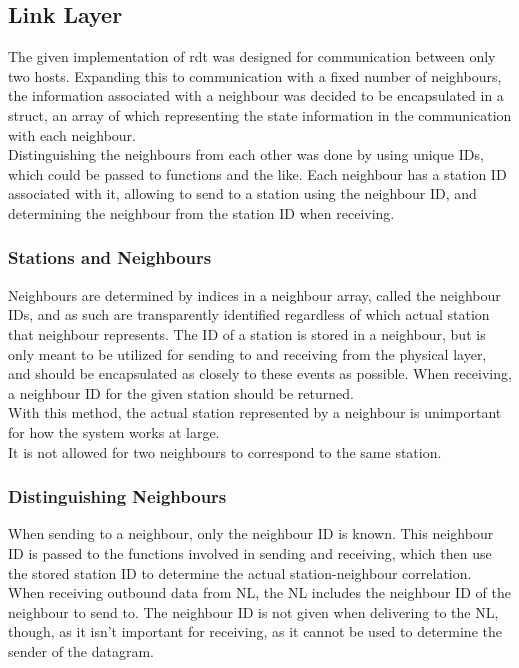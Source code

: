 \subsection{Link Layer}
The given implementation of rdt was designed for communication between only two hosts. Expanding this to communication with a fixed number of neighbours, the information associated with a neighbour was decided to be encapsulated in a struct, an array of which representing the state information in the communication with each neighbour.\\
Distinguishing the neighbours from each other was done by using unique IDs, which could be passed to functions and the like. Each neighbour has a station ID associated with it, allowing to send to a station using the neighbour ID, and determining the neighbour from the station ID when receiving.

\subsubsection{Stations and Neighbours}
Neighbours are determined by indices in a neighbour array, called the neighbour IDs, and as such are transparently identified regardless of which actual station that neighbour represents. The ID of a station is stored in a neighbour, but is only meant to be utilized for sending to and receiving from the physical layer, and should be encapsulated as closely to these events as possible. When receiving, a neighbour ID for the given station should be returned.\\
With this method, the actual station represented by a neighbour is unimportant for how the system works at large.\\
It is not allowed for two neighbours to correspond to the same station.

%

\subsubsection{Distinguishing Neighbours}
When sending to a neighbour, only the neighbour ID is known. This neighbour ID is passed to the functions involved in sending and receiving, which then use the stored station ID to determine the actual station-neighbour correlation.\\
When receiving outbound data from NL, the NL includes the neighbour ID of the neighbour to send to. The neighbour ID is not given when delivering to the NL, though, as it isn't important for receiving, as it cannot be used to determine the sender of the datagram.

